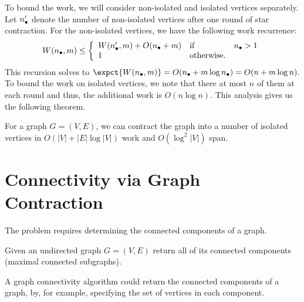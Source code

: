 {To bound the work, we will consider non-isolated and isolated vertices
separately.
%
Let $n_\bullet'$  denote the  number of non-isolated vertices after one
round of star contraction.
%
For the non-isolated vertices, we have the following work recurrence:
\[
\begin{array}{lll}
W(n_\bullet, m) 
\leq 
\left\{
\begin{array}{lll}
W(n_\bullet', m) + O(n_\bullet+m) & \mbox{if} & n_\bullet > 1
\\
1 & \mbox{otherwise.}
\end{array}
\right.
\end{array}
\]
%
This recursion solves to $\expct{W(\nn,m)} =
O(\nn + m\log \nn) = O(n + m \log{n}).$ To bound the work on isolated
vertices, we note that there at most $n$ of them at each round and
thus, the additional work is $O(n \log{n}).$ This analysis gives us
the following theorem.

\begin{theorem}
\label{thm:gc::star-contraction-cost}
  For a graph $G = (V,E)$, we can contract the graph into a number of
  isolated vertices   in $O(|V| + |E| \log |V|)$ work and $O(\log^2 |V|)$ span.
\end{theorem}




\section{Connectivity via Graph Contraction}



The 
problem requires determining the connected components of a graph.
%
\begin{problem}
Given an undirected graph $G = (V,E)$ return all of its connected
components (maximal connected subgraphs).
\end{problem}
%
A graph connectivity algorithm could return the connected components
of a graph, by, for example, specifying the set of vertices in each
component.


}
